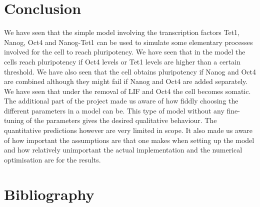 \newpage
\section{Conclusion}
We have seen that the simple model involving the transcription factors Tet1, Nanog, Oct4 and Nanog-Tet1 can be used to simulate
some elementary processes involved for the cell to reach pluripotency. 
We have seen that in the model the cells reach pluripotency if Oct4 levels or Tet1 levels are higher than a certain threshold.
We have also seen that the cell obtains pluripotency if Nanog and Oct4 are combined although they might fail if Nanog and Oct4 are added separately.
We have seen that under the removal of LIF and Oct4 the cell becomes somatic.
The additional part of the project made us aware of how fiddly choosing the different parameters in a model can be.
This type of model without any fine-tuning of the parameters gives the desired qualitative behaviour.
The quantitative predictions however are very limited in scope. It also made us aware of how important the assumptions are that one makes when setting
up the model and how relatively unimportant the actual implementation and the numerical optimisation are for the results.

\section*{Bibliography}
\nocite{*}
\printbibliography[heading=none, keyword={secondary}]



